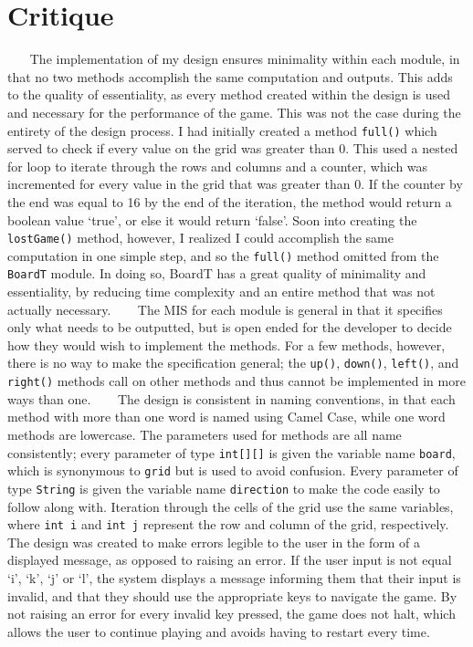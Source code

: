 \documentclass[12pt]{article}
\begin{document}
\section* {Critique}
$~~$$~~$$~~$$~~$The implementation of my design ensures minimality within each module, in that no two methods accomplish the same computation and outputs. This adds to the quality of essentiality, as every method created within the design is used and necessary for the performance of the game. This was not the case during the entirety of the design process. I had initially created a method \verb|full()| which served to check if every value on the grid was greater than 0. This used a nested for loop to iterate through the rows and columns and a counter, which was incremented for every value in the grid that was greater than 0. If the counter by the end was equal to 16 by the end of the iteration, the method would return a boolean value ‘true’, or else it would return ‘false’. Soon into creating the \verb|lostGame()| method, however, I realized I could accomplish the same computation in one simple step, and so the \verb|full()| method omitted from the \verb|BoardT| module. In doing so, BoardT has a great quality of minimality and essentiality, by reducing time complexity and an entire method that was not actually necessary. \newline
\newline
$~~$$~~$$~~$$~~$The MIS for each module is general in that it specifies only what needs to be outputted, but is open ended for the developer to decide how they would wish to implement the methods. For a few methods, however, there is no way to make the specification general; the \verb|up()|, \verb|down()|, \verb|left()|, and \verb|right()| methods call on other methods and thus cannot be implemented in more ways than one. \newline
\newline
$~~$$~~$$~~$$~~$The design is consistent in naming conventions, in that each method with more than one word is named using Camel Case, while one word methods are lowercase. The parameters used for methods are all name consistently; every parameter of type \verb|int[][]| is given the variable name \verb|board|, which is synonymous to \verb|grid| but is used to avoid confusion. Every parameter of type \verb|String| is given the variable name \verb|direction| to make the code easily to follow along with. Iteration through the cells of the grid use the same variables, where \verb|int i| and \verb|int j| represent the row and column of the grid, respectively. The design was created to make errors legible to the user in the form of a displayed message, as opposed to raising an error. If the user input is not equal ‘i’, ‘k’, ‘j’ or ‘l’, the system displays a message informing them that their input is invalid, and that they should use the appropriate keys to navigate the game. By not raising an error for every invalid key pressed, the game does not halt, which allows the user to continue playing and avoids having to restart every time. 
\end{document}
